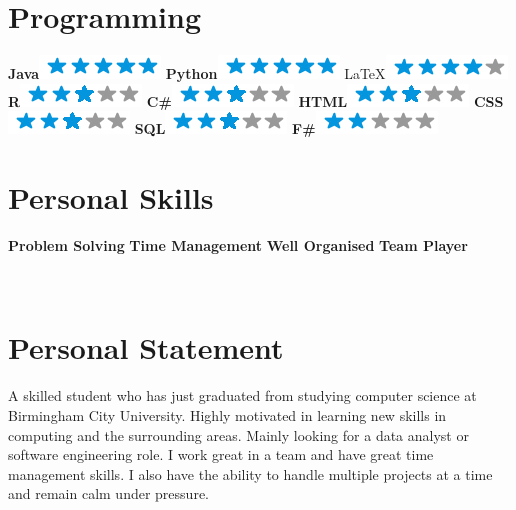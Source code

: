 \documentclass[]{friggeri-cv}
\begin{document}
\begin{aside}
  \section{Programming}
    \textbf{Java}\includegraphics[scale=0.40]{img/5stars.png}
    \textbf{Python}\includegraphics[scale=0.40]{img/5stars.png}
    \LaTeX \includegraphics[scale=0.40]{img/4stars.png}
    \textbf{R}\includegraphics[scale=0.40]{img/3stars.png}
    \textbf{C\#}\includegraphics[scale=0.40]{img/3stars.png}
    \textbf{HTML}\includegraphics[scale=0.40]{img/3stars.png}
    \textbf{CSS}\includegraphics[scale=0.40]{img/3stars.png}
    \textbf{SQL}\includegraphics[scale=0.40]{img/3stars.png}    
    \textbf{F\#}\includegraphics[scale=0.40]{img/2stars.png}
    ~
  \section{Personal Skills}
    \textbf{Problem Solving}
    \textbf{Time Management}
    \textbf{Well Organised}
    \textbf{Team Player}    
    ~
\end{aside}
~
\section{Personal Statement}
A skilled student who has just graduated from studying computer science at Birmingham City
University. Highly motivated in learning new skills in computing and the surrounding areas. Mainly
looking for a data analyst or software engineering role. I work great in a team and have great time
management skills. I also have the ability to handle multiple projects at a time and remain calm under pressure.
\end{document}
